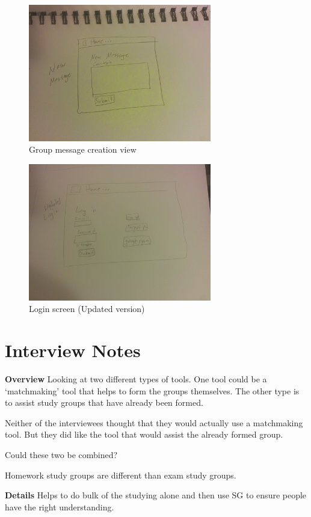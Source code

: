 \documentclass[conference]{IEEEtran}
\begin{document}
\begin{figure}[ht!]
\centering
\includegraphics[width=80mm]{figures/newMessageSketch}
\caption{Group message creation view
\label{fig:newMessageSketch}}
\end{figure}

\begin{figure}[ht!]
\centering
\includegraphics[width=80mm]{figures/updatedLoginSketch}
\caption{Login screen (Updated version)
\label{fig:updatedLoginSketch}}
\end{figure}

\section{Interview Notes}
\textbf{Overview}
Looking at two different types of tools. One tool could be a `matchmaking' tool that helps to form the groups themselves. The other type is to assist study groups that have already been formed.

Neither of the interviewees thought that they would actually use a matchmaking tool. But they did like the tool that would assist the already formed group.

Could these two be combined?

Homework study groups are different than exam study groups.

\textbf{Details}
Helps to do bulk of the studying alone and then use SG to ensure people have the right understanding.
\end{document}
